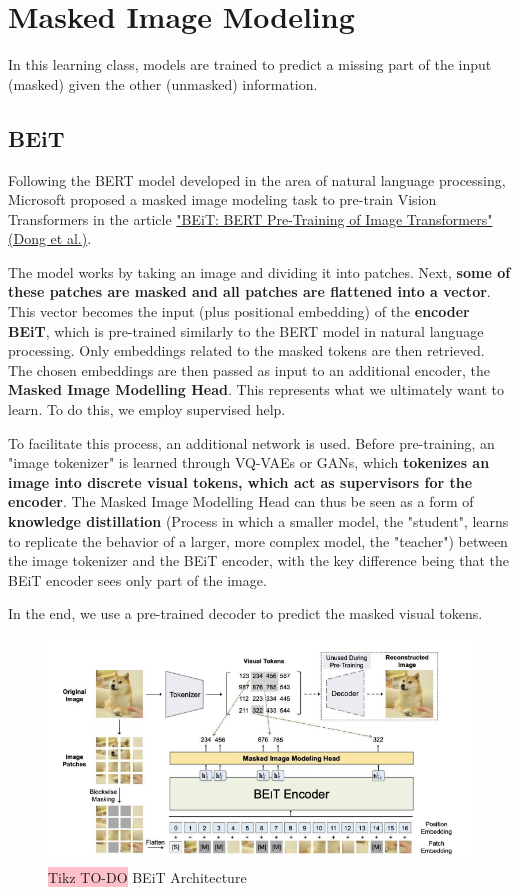 \section{Masked Image Modeling}

In this learning class, models are trained to predict a missing part of the input (masked) given the other (unmasked) information.

\subsection{BEiT}

Following the BERT model developed in the area of natural language processing, Microsoft proposed a masked image modeling task to pre-train Vision Transformers in the article \href{https://arxiv.org/pdf/2106.08254}{"BEiT: BERT Pre-Training of Image Transformers" (Dong et al.)}.

The model works by taking an image and dividing it into patches. Next, \textbf{some of these patches are masked and all patches are flattened into a vector}. This vector becomes the input (plus positional embedding) of the \textbf{encoder BEiT}, which is pre-trained similarly to the BERT model in natural language processing. Only embeddings related to the masked tokens are then retrieved. The chosen embeddings are then passed as input to an additional encoder, the \textbf{Masked Image Modelling Head}. This represents what we ultimately want to learn. To do this, we employ supervised help.

To facilitate this process, an additional network is used. Before pre-training, an "image tokenizer" is learned through VQ-VAEs or GANs, which \textbf{tokenizes an image into discrete visual tokens, which act as supervisors for the encoder}. The Masked Image Modelling Head can thus be seen as a form of \textbf{knowledge distillation} (Process in which a smaller model, the "student", learns to replicate the behavior of a larger, more complex model, the "teacher") between the image tokenizer and the BEiT encoder, with the key difference being that the BEiT encoder sees only part of the image.

In the end, we use a pre-trained decoder to predict the masked visual tokens.

\begin{figure}[!htbp]
    \centering
    \includegraphics[width=\linewidth]{tikz/chapter11 - BEiT.png}
    \caption{{\color{red}\colorbox{pink}{Tikz TO-DO}} BEiT Architecture}
\end{figure}

